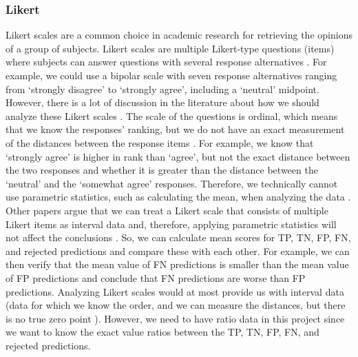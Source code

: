 \subsubsection{Likert}
\label{sec:likert}
Likert scales are a common choice in academic research for retrieving the opinions of a group of subjects.
%
Likert scales are multiple Likert-type questions (items) where subjects can answer questions with several response alternatives \citep{boone2012analyzing}.
%
For example, we could use a bipolar scale with seven response alternatives ranging from `strongly disagree' to `strongly agree', including a `neutral' midpoint.
%
However, there is a lot of discussion in the literature about how we should analyze these Likert scales \citep{boone2012analyzing, allen2007likert, norman2010likert, murray2013likert}.
%
The scale of the questions is ordinal, which means that we know the responses' ranking, but we do not have an exact measurement of the distances between the response items \citep{allen2007likert}.
%
For example, we know that `strongly agree' is higher in rank than `agree', but not the exact distance between the two responses and whether it is greater than the distance between the `neutral' and the `somewhat agree' responses.
%
Therefore, we technically cannot use parametric statistics, such as calculating the mean, when analyzing the data \citep{allen2007likert}.
%
Other papers argue that we can treat a Likert scale that consists of multiple Likert items as interval data and, therefore, applying parametric statistics will not affect the conclusions \citep{boone2012analyzing, norman2010likert, murray2013likert}.
%
So, we can calculate mean scores for TP, TN, FP, FN, and rejected predictions and compare these with each other.
%
For example, we can then verify that the mean value of FN predictions is smaller than the mean value of FP predictions and conclude that FN predictions are worse than FP predictions.
%
Analyzing Likert scales would at most provide us with interval data (data for which we know the order, and we can measure the distances, but there is no true zero point \citep{allen2007likert}).
%
However, we need to have ratio data in this project since we want to know the exact value ratios between the TP, TN, FP, FN, and rejected predictions.

